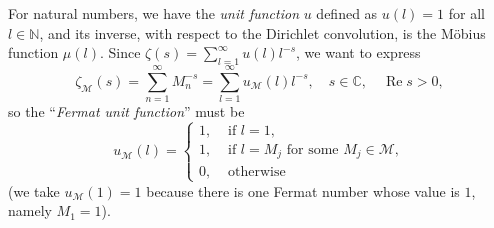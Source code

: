 \documentclass[11pt, a4paper]{article}
\newcommand{\N}{\mathbb{N}}
\newcommand{\C}{\mathbb{C}}
\renewcommand{\Re}{\operatorname{Re}}
\newcommand{\calM}{\mathcal{M}}
\newcommand{\uM}{u_\calM}
\theoremstyle{plain}
\theoremstyle{definition}
\begin{document}
For natural numbers, we have the \textit{unit function} $u$ defined as $u(l)=1$ for all $l \in \N$, and its inverse, with respect to the Dirichlet convolution, is the M\"obius function $\mu(l)$. Since $\zeta(s) = \sum_{l=1}^{\infty} u(l)l^{-s}$, we want to express 
\begin{equation}
\label{eq:uMDir}
  \zeta_{\calM}(s) = \sum_{n=1}^{\infty} M_n^{-s} = \sum_{l=1}^{\infty} \uM(l) l^{-s},
  \quad s \in \C, \quad \Re s>0,
\end{equation}
so the ``\textit{Fermat unit function}'' must be
\begin{equation}
\label{eq:uM}
  \uM(l) = 
  \begin{cases}
    1, & \text{ if } l=1,\\
    1, & \text{ if } l=M_j \text{ for some } M_j \in \calM,\\
    0, & \text{ otherwise}
  \end{cases}
\end{equation}
(we take $\uM(1)=1$ because there is one Fermat number whose value is $1$, namely $M_1=1$).
\end{document}
